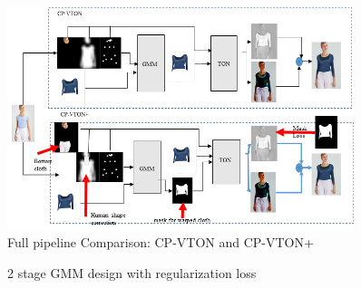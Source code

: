 \begin{figure}
\centering
\includegraphics[height=6.5cm, scale=1]{figures/cpvton+pipeline.png}   
\caption{Full pipeline Comparison: CP-VTON and CP-VTON+}
\label{fig:piepline}
\end{figure}

\begin{figure}
\centering
\caption{2 stage GMM design with regularization loss}
\label{fig:piepline}
\end{figure}

